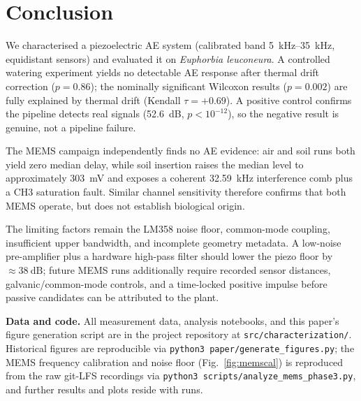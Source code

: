 \documentclass[10pt,a4paper,twocolumn]{article}
\begin{document}
\section{Conclusion}

We characterised a piezoelectric AE system (calibrated band \SIrange{5}{35}{\kilo\hertz}, equidistant sensors) and evaluated it on \textit{Euphorbia leuconeura}. A controlled watering experiment yields no detectable AE response after thermal drift correction ($p=0.86$); the nominally significant Wilcoxon results ($p=0.002$) are fully explained by thermal drift (Kendall $\tau=+0.69$). A positive control confirms the pipeline detects real signals (\SI{+52.6}{\deci\bel}, $p<10^{-12}$), so the negative result is genuine, not a pipeline failure.

The MEMS campaign independently finds no AE evidence: air and soil runs both yield zero median delay, while soil insertion raises the median level to approximately \SI{303}{\milli\volt} and exposes a coherent \SI{32.59}{\kilo\hertz} interference comb plus a CH3 saturation fault. Similar channel sensitivity therefore confirms that both MEMS operate, but does not establish biological origin.

The limiting factors remain the LM358 noise floor, common-mode coupling, insufficient upper bandwidth, and incomplete geometry metadata. A low-noise pre-amplifier plus a hardware high-pass filter should lower the piezo floor by $\approx\SI{38}{\deci\bel}$; future MEMS runs additionally require recorded sensor distances, galvanic/common-mode controls, and a time-locked positive impulse before passive candidates can be attributed to the plant.

\vspace{4pt}
\noindent\textbf{Data and code.} All measurement data, analysis notebooks, and this paper's figure generation script are in the project repository at \texttt{src/characterization/}. Historical figures are reproducible via \texttt{python3 paper/generate\_figures.py}; the MEMS frequency calibration and noise floor (Fig.~\ref{fig:memscal}) is reproduced from the raw \mbox{git-LFS} recordings via \texttt{python3 scripts/analyze\_mems\_phase3.py}, and further results and plots reside with runs.
\end{document}
